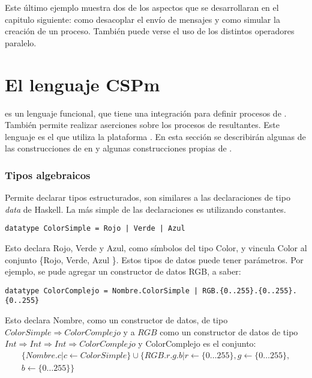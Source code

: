 Este último ejemplo muestra dos de los aspectos que se desarrollaran en el capitulo siguiente: como desacoplar el envío de mensajes y como simular la creación de un proceso. También puede verse el uso de los distintos operadores paralelo.
 
\section{El lenguaje CSPm}

\CSPm es un lenguaje funcional, que tiene una integración para definir procesos de \CSP. También permite realizar aserciones sobre los procesos de \CSP resultantes. Este lenguaje es el que utiliza la plataforma \FDR. En esta sección se describirán algunas de las construcciones de \CSP en \CSPm y algunas construcciones propias de \CSPm.

\subsubsection{Tipos algebraicos}

Permite declarar tipos estructurados, son similares a las declaraciones de tipo \textit{data} de Haskell. La más simple de las declaraciones es utilizando constantes.

\begin{verbatim}
datatype ColorSimple = Rojo | Verde | Azul
\end{verbatim}

Esto declara Rojo, Verde y Azul, como símbolos del tipo Color, y vincula Color al conjunto \{Rojo, Verde, Azul \}. Estos tipos de datos puede tener parámetros. Por ejemplo, se pude agregar un constructor de datos RGB, a saber:

\begin{verbatim}
datatype ColorComplejo = Nombre.ColorSimple | RGB.{0..255}.{0..255}.{0..255}
\end{verbatim}

Esto declara Nombre, como un constructor de datos, de tipo $ColorSimple \Rightarrow ColorComplejo$ y a $RGB$ como un constructor de datos de  tipo $Int \Rightarrow Int \Rightarrow Int \Rightarrow ColorComplejo$ y ColorComplejo es el conjunto:
\begin{multline*}
\{ Nombre.c | c \leftarrow  ColorSimple \} \cup \{ RGB.r.g.b |  r \leftarrow \{ 0 \dots 255 \},  g \leftarrow \{ 0 \dots 255 \}, \\  b \leftarrow \{ 0 \dots 255 \} \}  
\end{multline*}

